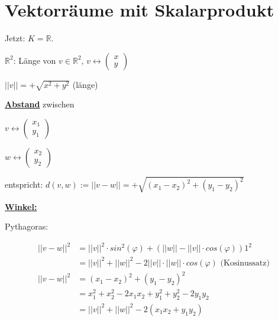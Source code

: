 \documentclass[a4paper, openany]{book}
\begin{document}
        \chapter{Vektorräume mit Skalarprodukt}

        Jetzt: \underline{$K = \mathbb{R}$}.

        $\mathbb{R}^2$: Länge von $v \in \mathbb{R}^2$, $v \leftrightarrow \begin{pmatrix}x \\ y \end{pmatrix}$

        \par \medskip

        $||v|| = + \sqrt{x^2 + y^2}$ (länge)

        \par \medskip

        \underline{\textbf{Abstand}} zwischen

        \begin{center}
          $v \leftrightarrow \begin{pmatrix}x_1 \\ y_1 \end{pmatrix}$

          \par \medskip

          $w \leftrightarrow \begin{pmatrix}x_2 \\ y_2 \end{pmatrix}$
        \end{center}

        entspricht: $d(v,w) := || v - w || = + \sqrt{(x_1 - x_2)^2 + (y_1 - y_2)^2}$

        \par \medskip

        \underline{\textbf{Winkel:}}

        Pythagoras: 

        \begin{align*}
          ||v-w||^2 & = ||v||^2 \cdot sin^2(\varphi) + (||w|| - ||v|| \cdot cos(\varphi))1^2 \\
                    & = ||v||^2 + ||w||^2 - 2 ||v|| \cdot ||w|| \cdot cos(\varphi) \text{ (Kosinussatz)} \\
          ||v-w||^2 & = (x_1-x_2)^2 + (y_1-y_2)^2 \\
                    & = x_1^2 + x_2^2 - 2x_1x_2 + y_1^2 + y_2^2 - 2y_1y_2 \\
                    & = ||v||^2 + ||w||^2 - 2(x_1x_2 + y_1y_2)
        \end{align*}
\end{document}
